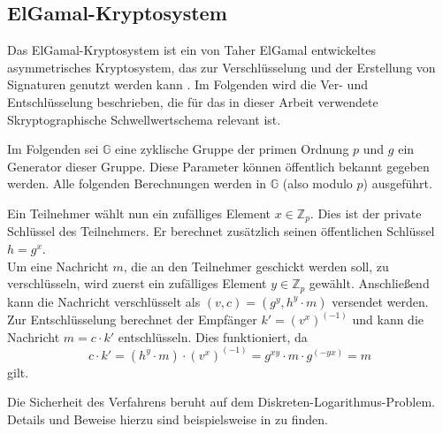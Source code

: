 \subsection{ElGamal-Kryptosystem}

\label{sec_basics_threshold_elgamal}

Das ElGamal-Kryptosystem ist ein von Taher ElGamal entwickeltes asymmetrisches Kryptosystem, das zur Verschlüsselung und der Erstellung von Signaturen genutzt werden kann \cite{elgamal1985}. Im Folgenden wird die Ver- und Entschlüsselung beschrieben, die für das in dieser Arbeit verwendete Skryptographische Schwellwertschema relevant ist.

Im Folgenden sei \(\mathbb{G}\) eine zyklische Gruppe der primen Ordnung \(p\) und \(g\) ein Generator dieser Gruppe. Diese Parameter können öffentlich bekannt gegeben werden. Alle folgenden Berechnungen werden in \(\mathbb{G}\) (also modulo \(p\)) ausgeführt.

Ein Teilnehmer wählt nun ein zufälliges Element \(x \in \mathbb{Z}_p\). Dies ist der private Schlüssel des Teilnehmers. Er berechnet zusätzlich seinen öffentlichen Schlüssel \(h = g^x\).\\
Um eine Nachricht \(m\), die an den Teilnehmer geschickt werden soll, zu verschlüsseln, wird zuerst ein zufälliges Element \(y \in \mathbb{Z}_p\) gewählt. Anschließend kann die Nachricht verschlüsselt als \((v, c) = (g^y, h^y \cdot m)\) versendet werden.\\
Zur Entschlüsselung berechnet der Empfänger \(k' = (v^x)^{(-1)}\) und kann die Nachricht \(m = c \cdot k'\) entschlüsseln. Dies funktioniert, da 
\[c \cdot k' = (h^y \cdot m) \cdot (v^x)^{(-1)} = g^{xy} \cdot m \cdot g^{(-yx)} = m\]
gilt.

Die Sicherheit des Verfahrens beruht auf dem Diskreten-Logarithmus-Problem. Details und Beweise hierzu sind beispielsweise in \cite{katz2014} zu finden. 
